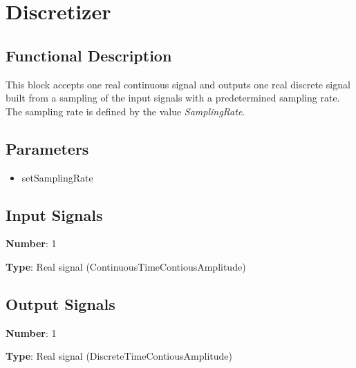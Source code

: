 \section{Discretizer}

\subsection*{Functional Description}

This block accepts one real continuous signal and outputs one real discrete signal built from a sampling of the input signals with a predetermined sampling rate. The sampling rate is defined by the value \textit{SamplingRate}.


\subsection*{Parameters}

\begin{multicols}{2}
	\begin{itemize}
		\item setSamplingRate
	\end{itemize}
\end{multicols}

\subsection*{Input Signals}

\textbf{Number}: 1

\textbf{Type}: Real signal (ContinuousTimeContiousAmplitude)

\subsection*{Output Signals}

\textbf{Number}: 1

\textbf{Type}: Real signal (DiscreteTimeContiousAmplitude)